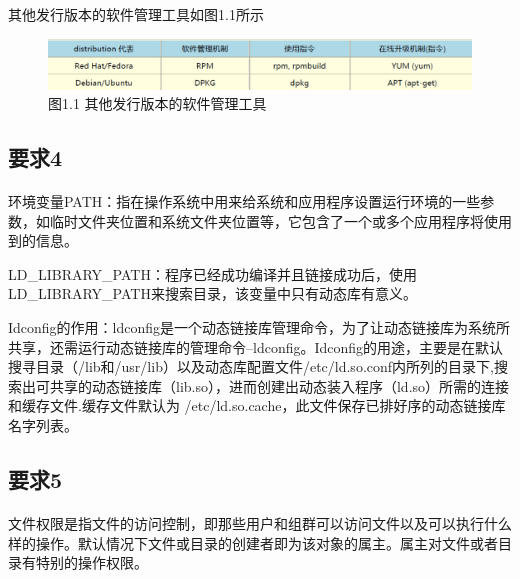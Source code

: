 \documentclass[40pt,a4paper，UTF8]{ctexart}
\begin{document}
其他发行版本的软件管理工具如图1.1所示
\begin{figure}[H]
\centering
\includegraphics[width=4.8in]{ch1_1_1.png} {图1.1 其他发行版本的软件管理工具}
\end{figure}

\paragraph{}

\subsection{要求4}
\paragraph{}
环境变量PATH：指在操作系统中用来给系统和应用程序设置运行环境的一些参数，如临时文件夹位置和系统文件夹位置等，它包含了一个或多个应用程序将使用到的信息。

LD\_LIBRARY\_PATH：程序已经成功编译并且链接成功后，使用\\LD\_LIBRARY\_PATH来搜索目录，该变量中只有动态库有意义。


Idconfig的作用：ldconfig是一个动态链接库管理命令，为了让动态链接库为系统所共享，还需运行动态链接库的管理命令–ldconfig。Idconfig的用途，主要是在默认搜寻目录（/lib和/usr/lib）以及动态库配置文件/etc/ld.so.conf内所列的目录下,搜索出可共享的动态链接库（lib.so），进而创建出动态装入程序（ld.so）所需的连接和缓存文件.缓存文件默认为 /etc/ld.so.cache，此文件保存已排好序的动态链接库名字列表。

\paragraph{}

\subsection{要求5}
\paragraph{}
文件权限是指文件的访问控制，即那些用户和组群可以访问文件以及可以执行什么样的操作。默认情况下文件或目录的创建者即为该对象的属主。属主对文件或者目录有特别的操作权限。
\end{document}
